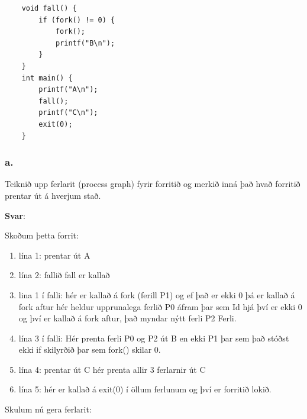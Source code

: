 \documentclass{article}
\begin{document}
\begin{verbatim}
    void fall() {
        if (fork() != 0) {
            fork();
    	    printf("B\n");
        }
    }
    int main() {
        printf("A\n");
        fall();
        printf("C\n");
        exit(0);
    }

\end{verbatim}

\subsubsection{a.} Teiknið upp ferlarit (process graph) fyrir forritið og merkið inná það hvað
forritið prentar út á hverjum stað.

\textbf{Svar}:

Skoðum þetta forrit:

\begin{enumerate}
    \item lína 1: prentar út A
    \item lína 2: fallið fall er kallað
    \item lina 1 í falli: hér er kallað á fork (ferill P1) og ef það er ekki 0 þá er kallað á fork aftur
          hér heldur upprunalega ferlið P0 áfram þar sem Id hjá því er ekki 0 og því er kallað á fork aftur,
            það myndar nýtt ferli P2 Ferli.
    \item lína 3 í falli: Hér prenta ferli P0 og P2 út B en ekki P1 þar sem það stóðst ekki if skilyrðið þar sem fork() skilar 0.
    \item lína 4: prentar út C hér prenta allir 3 ferlarnir út C
    \item lína 5: hér er kallað á exit(0) í öllum ferlunum og því er forritið lokið.
\end{enumerate}

Skulum nú gera ferlarit:
\end{document}
